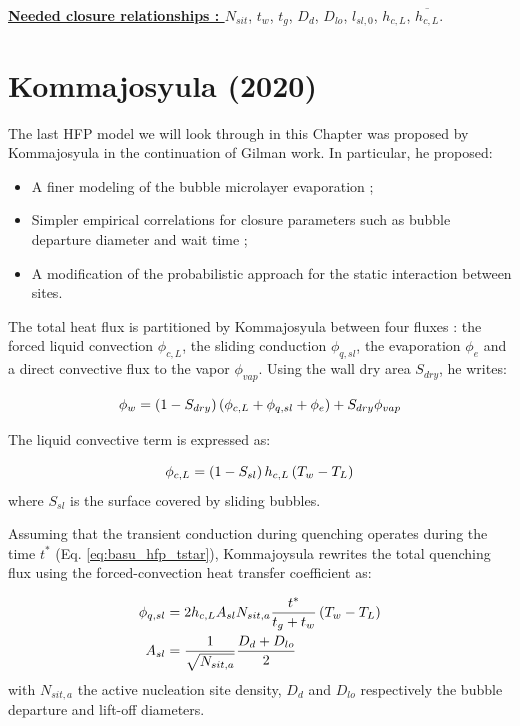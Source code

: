 \npar

\textbf{\underline{Needed closure relationships : }} $N_{sit}$, $t_{w}$, $t_{g}$, $D_{d}$, $D_{lo}$, $l_{sl,0}$, $h_{c,L}$, $\overline{h_{c,L}}$. 



\section{Kommajosyula (2020)}
\label{sec:hfp_komma}

The last HFP model we will look through in this Chapter was proposed by Kommajosyula \cite{kommajosyula_development_2020} in the continuation of Gilman \cite{gilman_phd} work. In particular, he proposed:

\begin{itemize}
\item A finer modeling of the bubble microlayer evaporation ;
\item Simpler empirical correlations for closure parameters such as bubble departure diameter and wait time ;
\item A modification of the probabilistic approach for the static interaction between sites.
\end{itemize}

The total heat flux is partitioned by Kommajosyula between four fluxes : the forced liquid convection $\phi_{c,L}$, the sliding conduction $\phi_{q,sl}$, the evaporation $\phi_{e}$ and a direct convective flux to the vapor $\phi_{vap}$. Using the wall dry area $S_{dry}$, he writes:

\begin{equation}
\phi_{w} = \left( 1-S_{dry} \right)\left( \phi_{c,L} + \phi_{q,sl} + \phi_{e} \right) + S_{dry} \phi_{vap}
\end{equation}

The liquid convective term is expressed as:

\begin{equation}
\phi_{c,L} = \left( 1-S_{sl} \right)h_{c,L}\left( T_{w} - T_{L} \right)
\end{equation}
where $S_{sl}$ is the surface covered by sliding bubbles.

Assuming that the transient conduction during quenching operates during the time $t^{*}$ (Eq. \ref{eq:basu_hfp_tstar}), Kommajoysula rewrites the total quenching flux using the forced-convection heat transfer coefficient as:

\begin{align}
\phi_{q,sl} &= 2 h_{c,L} A_{sl} N_{sit,a} \frac{t^{*}}{t_{g}+t_{w}}\left( T_{w}-T_{L} \right)\\
A_{sl} &= \dfrac{1}{\sqrt{N_{sit,a}}} \frac{D_{d} + D_{lo}}{2}
\end{align}
with $N_{sit,a}$ the active nucleation site density, $D_{d}$ and $D_{lo}$ respectively the bubble departure and lift-off diameters.

